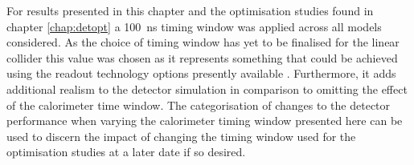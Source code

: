 For results presented in this chapter and the optimisation studies found in chapter \ref{chap:detopt} a 100~ns timing window was applied across all models considered.  As the choice of timing window has yet to be finalised for the linear collider this value was chosen as it represents something that could be achieved using the readout technology options presently available \cite{Adloff:2014rya}.  Furthermore, it adds additional realism to the detector simulation in comparison to omitting the effect of the calorimeter time window.  The categorisation of changes to the detector performance when varying the calorimeter timing window presented here can be used to discern the impact of changing the timing window used for the optimisation studies at a later date if so desired.  


